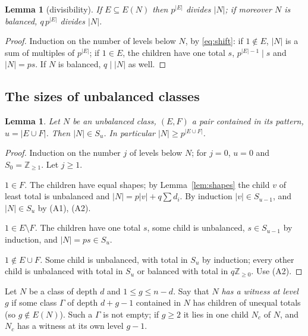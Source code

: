 \documentclass[11pt,a4paper]{amsart}
\newtheorem{lemma}[theorem]{Lemma}
\theoremstyle{definition}
\theoremstyle{remark}
\newcommand{\Z}{\mathbb{Z}}
\begin{document}
\begin{lemma}[divisibility]\label{lem:div}
If $E\subseteq E(N)$ then $p^{|E|}$ divides $|N|$; if moreover $N$ is balanced, $q\,p^{|E|}$ divides $|N|$.
\end{lemma}
\begin{proof}
Induction on the number of levels below $N$, by \eqref{eq:shift}: if $1\notin E$, $|N|$ is a sum of multiples
of $p^{|E|}$; if $1\in E$, the children have one total $s$, $p^{|E|-1}\mid s$ and $|N|=ps$. If $N$ is
balanced, $q\mid |N|$ as well.
\end{proof}

\subsection{The sizes of unbalanced classes}

\begin{lemma}\label{lem:S}
Let $N$ be an unbalanced class, $(E,F)$ a pair contained in its pattern, $u=|E\cup F|$. Then $|N|\in S_u$. In
particular $|N|\ge p^{|E\cup F|}$.
\end{lemma}
\begin{proof}
Induction on the number $j$ of levels below $N$; for $j=0$, $u=0$ and $S_0=\Z_{\ge1}$. Let $j\ge1$.

\emph{$1\in F$.} The children have equal shapes; by Lemma~\ref{lem:shapes} the child $v$ of least total is
unbalanced and $|N|=p|v|+q\sum d_i$. By induction $|v|\in S_{u-1}$, and $|N|\in S_u$ by (A1), (A2).

\emph{$1\in E\setminus F$.} The children have one total $s$, some child is unbalanced, $s\in S_{u-1}$ by
induction, and $|N|=ps\in S_u$.

\emph{$1\notin E\cup F$.} Some child is unbalanced, with total in $S_u$ by induction; every other child is
unbalanced with total in $S_u$ or balanced with total in $q\Z_{\ge0}$. Use (A2).
\end{proof}

Let $N$ be a class of depth $d$ and $1\le g\le n-d$. Say that $N$ \emph{has a witness at level $g$} if some
class $\Gamma$ of depth $d+g-1$ contained in $N$ has children of unequal totals (so $g\notin E(N)$). Such a
$\Gamma$ is not empty; if $g\ge2$ it lies in one child $N_c$ of $N$, and $N_c$ has a witness at its own level
$g-1$.
\end{document}
